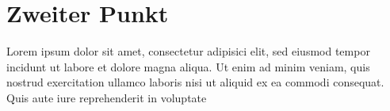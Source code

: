 \section{Zweiter Punkt}
Lorem ipsum dolor sit amet, consectetur adipisici elit, sed eiusmod tempor incidunt ut labore et dolore magna aliqua. Ut enim ad minim veniam, quis nostrud exercitation ullamco laboris nisi ut aliquid ex ea commodi consequat. Quis aute iure reprehenderit in voluptate
